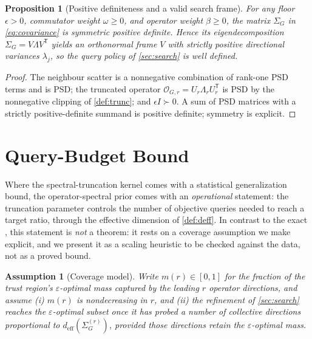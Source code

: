 \documentclass[aps,prxquantum,reprint,amsmath,amssymb,floatfix,nofootinbib,superscriptaddress,longbibliography]{revtex4-2}
\newtheorem{proposition}{Proposition}
\newtheorem{assumption}{Assumption}
\theoremstyle{remark}
\newcommand{\calO}{\mathcal{O}}
\begin{document}
\begin{proposition}[Positive definiteness and a valid search frame]
\label{prop:pd}
For any floor \(\epsilon>0\), commutator weight \(\omega\ge0\), and operator
weight \(\beta\ge0\), the matrix \(\Sigma_G\) in \cref{eq:covariance} is
symmetric positive definite.  Hence its eigendecomposition
\(\Sigma_G=V\Lambda V^{\mathsf T}\) yields an orthonormal frame \(V\) with
strictly positive directional variances \(\lambda_j\), so the query policy of
\cref{sec:search} is well defined.
\end{proposition}
\begin{proof}
The neighbour scatter is a nonnegative combination of rank-one PSD terms and is
PSD; the truncated operator \(\calO_{G,r}=U_r\Lambda_rU_r^{\mathsf T}\) is PSD by
the nonnegative clipping of \cref{def:trunc}; and \(\epsilon I\succ0\).  A sum of
PSD matrices with a strictly positive-definite summand is positive definite;
symmetry is explicit.
\end{proof}

\section{Query-Budget Bound}
\label{sec:bound}

Where the spectral-truncation kernel comes with a statistical generalization
bound, the operator-spectral prior comes with an \emph{operational} statement: the
truncation parameter controls the number of objective queries needed to reach a
target ratio, through the effective dimension of \cref{def:deff}.  In contrast to
the exact , this statement is \emph{not} a theorem:
it rests on a coverage assumption we make explicit, and we present it as a scaling
heuristic to be checked against the data, not as a proved bound.

\begin{assumption}[Coverage model]
\label{ass:coverage}
Write \(m(r)\in[0,1]\) for the fraction of the trust region's
\(\varepsilon\)-optimal mass captured by the leading \(r\) operator directions,
and assume (i) \(m(r)\) is nondecreasing in \(r\), and (ii) the refinement of
\cref{sec:search} reaches the \(\varepsilon\)-optimal subset once it has probed a
number of collective directions proportional to
\(d_{\mathrm{eff}}(\Sigma_G^{(r)})\), provided those directions retain the
\(\varepsilon\)-optimal mass.
\end{assumption}
\end{document}
